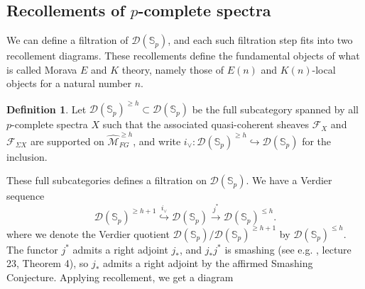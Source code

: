 \documentclass[a4paper]{article} %
\theoremstyle{definition}
\newtheorem{definition}[theorem]{Definition}
\newcommand{\moduliH}{\widehat{\mathcal{M}}_{FG}}
\newcommand{\Spp}{\mathcal{D}(\mathbb{S}_p)}
\begin{document}
\subsection{Recollements of $p$-complete spectra}\label{Subsection:recollementpcompletespectra}

We can define a filtration of $\Spp$, and each such filtration step fits into two recollement diagrams. These recollements define the fundamental objects of what is called Morava $E$ and $K$ theory, namely those of $E(n)$ and $K(n)$-local objects for a natural number $n$.
\begin{definition}
  Let $\Spp^{\ge h} \subset \Spp$
  be the full subcategory spanned by all $p$-complete spectra $X$ such that the associated quasi-coherent sheaves $\mathcal{F}_X$ and $\mathcal{F}_{\Sigma X}$ are supported on $\moduliH^{\ge h}$, and write $i_\vee \colon\Spp^{\ge h} \hookrightarrow \Spp$ for the inclusion.
\end{definition}
These full subcategories defines a filtration on $\Spp$. We have a Verdier sequence
\[
\Spp^{\ge h+1} \overset{i_\vee}{\hookrightarrow} \Spp \overset{j^*}{\to} \Spp^{\le h}.
\]
where we denote the Verdier quotient $\Spp/\Spp^{\ge h+1}$ by $\Spp^{\le h}$. The functor $j^*$ admits a right adjoint $j_*$, and $j_*j^*$ is smashing (see e.g. \cite{luriechromatichomotopytheorynotes}, lecture 23, Theorem 4), so $j_*$ admits a right adjoint by the affirmed Smashing Conjecture. Applying recollement, we get a diagram
\iffalse
\begin{center}
  \begin{tikzcd}
    X \arrow[dr, shift left=1ex, "i_\vee"] & & \\
    & X \arrow{r} \arrow[ul, shift right=1ex, "i_\vee"] & X \\
    X \arrow{ur} & &
  \end{tikzcd}
\end{center}
\fi
\end{document}
